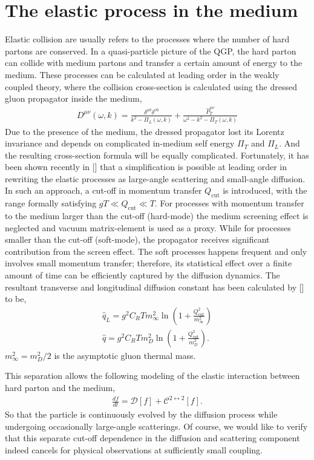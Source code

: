 \section{The elastic process in the medium}
Elastic collision are usually refers to the processes where the number of hard partons are conserved.
In a quasi-particle picture of the QGP, the hard parton can collide with medium partons and transfer a certain amount of energy to the medium.
These processes can be calculated at leading order in the weakly coupled theory, where the collision cross-section is calculated using the dressed gluon propagator inside the medium,
\begin{eqnarray}
D^{\mu\nu}(\omega, k) = \frac{\delta^{\mu 0}\delta^{\nu 0}}{k^2 - \Pi_L(\omega, k)} + \frac{\hat{P}_T^{\mu\nu}}{\omega^2 - k^2 - \Pi_T(\omega, k)}
\end{eqnarray}
Due to the presence of the medium, the dressed propagator lost its Lorentz invariance and depends on complicated in-medium self energy $\Pi_T$ and $\Pi_L$.
And the resulting cross-section formula will be equally complicated.
Fortunately, it has been shown recently in [] that a simplification is possible at leading order in rewriting the elastic processes as large-angle scattering and small-angle diffusion.
In such an approach, a cut-off in momentum transfer $Q_\textrm{cut}$ is introduced, with the range formally satisfying $gT \ll Q_\textrm{cut} \ll T$.
For processes with momentum transfer to the medium larger than the cut-off  (hard-mode) the medium screening effect is neglected and vacuum matrix-element is used as a proxy.
While for processes smaller than the cut-off (soft-mode), the propagator receives significant contribution from the screen effect.
The soft processes happens frequent and only involves small momentum transfer; therefore, its statistical effect over a finite amount of time can be efficiently captured by the diffusion dynamics.
The resultant transverse and longitudinal diffusion constant has been calculated by [] to be,
\begin{eqnarray}
\hat{q}_L = g^2 C_R T m_\infty^2  \ln\left(1+\frac{Q_{\textrm{cut}}^2}{m_\infty^2}\right) \\
\hat{q} = g^2 C_R T m_D^2  \ln\left(1+\frac{Q_{\textrm{cut}}^2}{m_D^2}\right).
\end{eqnarray}
$m_\infty^2 = m_D^2/2$ is the asymptotic gluon thermal mass.

This separation allows the following modeling of the elastic interaction between hard parton and the medium,
\begin{eqnarray}
\frac{df}{dt} = \mathcal{D}[f] + \mathcal{C}^{2\leftrightarrow 2}[f].
\end{eqnarray}
So that the particle is continuously evolved by the diffusion process while undergoing occasionally large-angle scatterings.
Of course, we would like to verify that this separate cut-off dependence in the diffusion and scattering component indeed cancels for physical observations at sufficiently small coupling.

